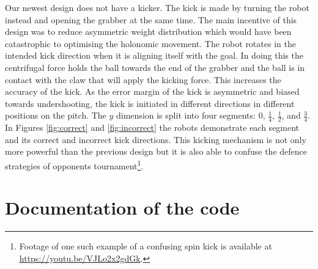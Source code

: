 \documentclass[a4paper,12pt]{article}
\begin{document}
Our newest design does not have a kicker. The kick is made by turning the robot instead and opening the grabber at the same time. The main incentive of this design was to reduce asymmetric weight distribution which would have been catastrophic to optimising the holonomic movement. The robot rotates in the intended kick direction when it is aligning itself with the goal. In doing this the centrifugal force holds the ball towards the end of the grabber and the ball is in contact with the claw that will apply the kicking force. This increases the accuracy of the kick. As the error margin of the kick is asymmetric and biased towards undershooting, the kick is initiated in different directions in different positions on the pitch. The $y$ dimension is split into four segments: $0$, $\frac{1}{4}$, $\frac{1}{2}$, and $\frac{3}{4}$. In Figures \ref{fig:correct} and \ref{fig:incorrect} the robots demonstrate each segment and its correct and incorrect kick directions. This kicking mechanism is not only more powerful than the previous design but it is also able to confuse the defence strategies of opponents tournament\footnote{Footage of one such example of a confusing spin kick is available at \url{https://youtu.be/VJLo2x2gdGk}.}.

\section{Documentation of the code}
\end{document}
